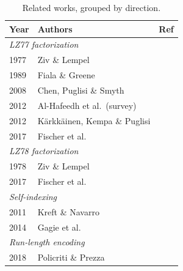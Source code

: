 \begin{table}[H]
    \centering
    \setlength{\tabcolsep}{11pt}
    \renewcommand{\arraystretch}{1.1}
    \begin{tabular}{llc}
        \toprule
        Year & Authors & Ref \\
        \midrule
        \multicolumn{3}{l}{\emph{LZ77 factorization}} \\
        1977 & Ziv \& Lempel & \cite{ziv1977} \\
        1989 & Fiala \& Greene & \cite{fiala1989} \\
        2008 & Chen, Puglisi \& Smyth & \cite{chen2008} \\
        2012 & Al-Hafeedh et al.\ (survey) & \cite{acm2012} \\
        2012 & K\"arkk\"ainen, Kempa \& Puglisi & \cite{kkp2012} \\
        2017 & Fischer et al. & \cite{fischer2017} \\
        \midrule
        \multicolumn{3}{l}{\emph{LZ78 factorization}} \\
        1978 & Ziv \& Lempel & \cite{ziv1978} \\
        2017 & Fischer et al. & \cite{fischer2017} \\
        \midrule
        \multicolumn{3}{l}{\emph{Self-indexing}} \\
        2011 & Kreft \& Navarro & \cite{kreft2011} \\
        2014 & Gagie et al. & \cite{gagie2014} \\
        \midrule
        \multicolumn{3}{l}{\emph{Run-length encoding}} \\
        2018 & Policriti \& Prezza & \cite{policriti2018} \\
        \bottomrule
    \end{tabular}
    \caption{Related works, grouped by direction.}
    \label{tab:related-work}
\end{table}